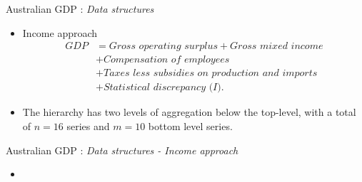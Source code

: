 \documentclass[11pt,xcolor=dvipsnames,table]{beamer} %
\begin{document}
\begin{frame}{Australian GDP : \textit{Data structures}}
\begin{itemize}[<+-| alert@+>]
	\item[] 
	
\begin{block}{Income approach}
		\begin{align*}
	\textit{GDP}
	& = \textit{Gross operating surplus} + \textit{Gross mixed income} \\
	& + \textit{Compensation of employees} \\
	& + \textit{Taxes less subsidies on production and imports} \\
	& + \textit{Statistical discrepancy (I)}.
	\end{align*}
\end{block}
	\item  The hierarchy has two levels of aggregation below the top-level, with a total of $n=16$ series and $m=10$ bottom level series.

\end{itemize}
\end{frame}



\begin{frame}{Australian GDP : \textit{Data structures - Income approach}}
\begin{itemize}[<+-| alert@+>]
	\item[] 
	\begin{figure}
	\end{figure}	
	
\end{itemize}
\end{frame}
\end{document}
